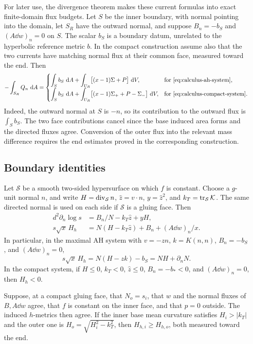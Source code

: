 For later use, the divergence theorem makes these current formulas into
exact finite-domain flux budgets.  Let $S$ be the inner boundary, with
normal pointing into the domain, let $S_R$ have the outward normal, and
suppose $B_n=-b_S$ and $(A\dd w)_n=0$ on $S$.  The scalar $b_S$ is a
boundary datum, unrelated to the hyperbolic reference metric $b$.
In the compact construction assume also that the two currents have
matching normal flux at their common face, measured toward the end.
Then
\begin{equation}
 -\int_{S_R}Q_n\,\mathop{}\!\mathrm d A=
 \begin{cases}
 \displaystyle\int_S b_S\,\mathop{}\!\mathrm d A+
    \int_{U_R}\bigl[(x-1)\Sigma+P\bigr]\,\mathop{}\!\mathrm d V,
       &\text{for \eqref{eq:calculus-ah-system}},\\[3pt]
 \displaystyle\int_S b_S\,\mathop{}\!\mathrm d A+
    \int_{U_R}\bigl[(x-1)\Sigma_++P-\Sigma_-\bigr]\,\mathop{}\!\mathrm d V,
       &\text{for \eqref{eq:calculus-compact-system}}.
 \end{cases}
 \label{eq:calculus-flux-budget}
\end{equation}
Indeed, the outward normal at $S$ is $-n$, so its contribution to the
outward flux is $\int_S b_S$.  The two face contributions cancel since
the base induced area forms and the directed fluxes agree.  Conversion
of the outer flux into the relevant mass difference requires the end
estimates proved in the corresponding construction.

\subsection{Boundary identities}

\begin{lemma}\label{lem:graph-boundary}
Let $\mathcal S$ be a smooth two-sided hypersurface on which $f$ is
constant.  Choose a $g$-unit normal $n$, and write $H=\operatorname{div}_{\mathcal S}n$,
$\hat z=v\cdot n$, $y=\hat z^2$, and
$k_T=\operatorname{tr}_{\mathcal S}\mathcal K$.  The same directed normal is used on
each side if $\mathcal S$ is a gluing face.  Then
\begin{align}
 d^2\partial_n\log s&=B_n/N-k_T\hat z+yH,
 \label{eq:calculus-boundary-lapse}\\
 s\sqrt{x}\,H_h
 &=N(H-k_T\hat z)+B_n+(A\dd w)_n/x.
 \label{eq:calculus-boundary}
\end{align}
In particular, in the maximal AH system with $v=-z n$,
$k=K(n,n)$, $B_n=-b_S$, and $(A\dd w)_n=0$,
\begin{equation}
 s\sqrt{x}\,H_h=N(H-zk)-b_S=NH+\partial_nN.
 \label{eq:calculus-ah-boundary}
\end{equation}
In the compact system, if $H\le0$, $k_T<0$, $\hat z\le0$,
$B_n=-b_*<0$, and $(A\dd w)_n=0$, then $H_h<0$.

Suppose, at a compact gluing face, that $N_o=s_i$, that $w$ and the
normal fluxes of $B,A\dd w$ agree, that $f$ is constant on the inner
face, and that $p=0$ outside.  The induced $h$-metrics then agree.
If the inner base mean curvature satisfies $H_i>|k_T|$ and the outer
one is $H_o=\sqrt{H_i^2-k_T^2}$, then
$H_{h,i}\ge H_{h,o}$, both measured toward the end.
\end{lemma}

